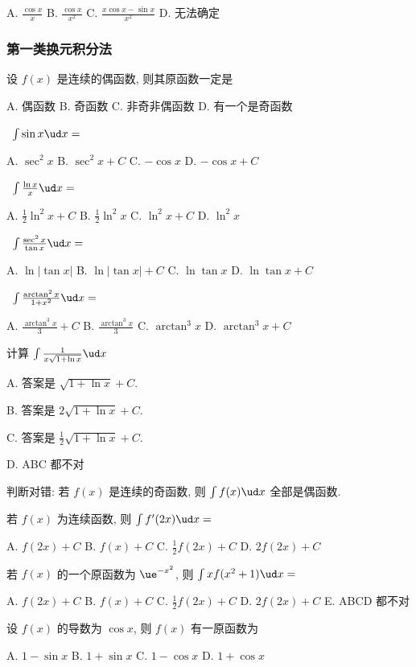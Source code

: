 A. $\frac{\cos x}{x}$\qquad
B. $\frac{\cos x}{x^2}$\qquad
C. $\frac{x \cos x-\sin x}{x^2}$\qquad
D. 无法确定
\eq

\subsubsection{第一类换元积分法}

\bq{}{}
设 $f(x)$ 是连续的偶函数, 则其原函数一定是

A. 偶函数\qquad
B. 奇函数\qquad
C. 非奇非偶函数\qquad
D. 有一个是奇函数
\eq

\bq{}{}
\ $
\int \sin x \ud x=
$

A. $\sec ^2 x$\qquad
B. $\sec ^2 x+{C}$\qquad
C. $-\cos x$\qquad
D. $-\cos x+{C}$
\eq

\bq{}{}
\ $
\int \frac{\ln x}{x} \ud x=
$

A. $\frac{1}{2} \ln ^2 x+C$
B. $\frac{1}{2} \ln ^2 x$
C. $\ln ^2 x+C$
D. $\ln ^2 x$
\eq

\bq{}{}
\ $
\int \frac{\sec^2 x}{\tan x} \ud x=
$

A. $\ln |\tan x|$\qquad
B. $\ln |\tan x|+{C}$\qquad
C. $\ln\tan x$\qquad
D. $\ln\tan x+{C}$
\eq

\bq{}{}
\ $
\int \frac{\arctan^2 x}{1+x^2} \ud x=
$

A. $\frac{\arctan^3 x}{3}+C$\qquad
B. $\frac{\arctan^3 x}{3}$\qquad
C. $\arctan^3 x$\qquad
D. $\arctan^3 x+{C}$
\eq

\bq{}{}
计算
$
\int \frac{1}{x \sqrt{1+\ln x}} {\ud} x
$


A. 答案是 $\sqrt{1+\ln x}+C$.

B. 答案是 $2 \sqrt{1+\ln x}+C$.

C. 答案是 $\frac{1}{2} \sqrt{1+\ln x}+C$.

D. ABC 都不对
\eq

\bq{}{}
判断对错: 若 $f(x)$ 是连续的奇函数, 则 $\int f(x) {\ud} x$ 全部是偶函数. 
\eq

\bq{}{}
若 $f(x)$ 为连续函数, 则 $\int f'(2x)\ud x=$

A. $f(2x)+C$\quad
B. $f(x)+C$\quad
C. $\frac12f(2x)+C$\quad
D. $2f(2x)+C$
\eq

\bq{}{}
若 $f(x)$ 的一个原函数为 $\ue^{-x^2}$, 则 $\int xf(x^2+1)\ud x=$

A. $f(2x)+C$\quad
B. $f(x)+C$\quad
C. $\frac12f(2x)+C$\quad
D. $2f(2x)+C$\quad
E. ABCD 都不对
\eq

\bq{}{}
设 $f(x)$ 的导数为 $\cos x$, 则 $f(x)$ 有一原函数为

A. $1-\sin x$\quad
B. $1+\sin x$\quad
C. $1-\cos x$\quad
D. $1+\cos x$
\eq

